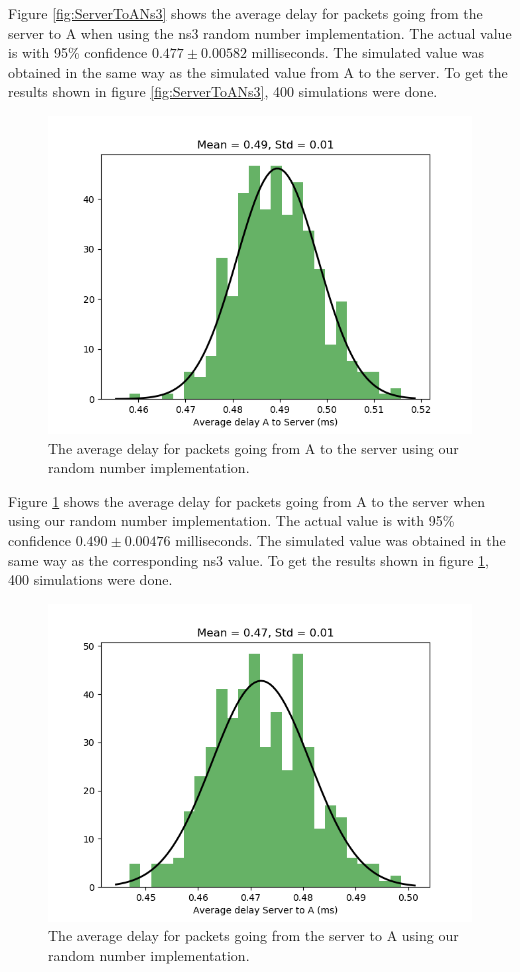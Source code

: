 \documentclass{article}
\begin{document}
Figure \ref{fig:ServerToANs3} shows the average delay for packets going from the server to A when using the ns3 random number implementation.
The actual value is with 95\% confidence $0.477 \pm 0.00582$ milliseconds.
The simulated value was obtained in the same way as the simulated value from A to the server.
To get the results shown in figure \ref{fig:ServerToANs3}, 400 simulations were done.

\begin{figure}[!htbp]
    \centering
    \includegraphics[width=0.85\linewidth]{our_as_delay.png}
    \caption{The average delay for packets going from A to the server using our random number implementation.}
    \label{fig:AtoServerOur}
\end{figure}

Figure \ref{fig:AtoServerOur} shows the average delay for packets going from A to the server when using our random number implementation.
The actual value is with 95\% confidence $0.490 \pm 0.00476$ milliseconds.
The simulated value was obtained in the same way as the corresponding ns3 value.
To get the results shown in figure \ref{fig:AtoServerOur}, 400 simulations were done.

\begin{figure}[!htbp]
    \centering
    \includegraphics[width=0.85\linewidth]{our_sa_delay.png}
    \caption{The average delay for packets going from the server to A using our random number implementation.}
    \label{fig:ServerToAOur}
\end{figure}
\end{document}
